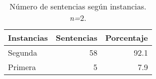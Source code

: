 \begin{table}[H]
\centering
\caption{Número de sentencias según instancias. \textit{n=}2.} 
\label{tab:instancia}
\begin{tabular}{lrr}
  \hline
Instancias & Sentencias & Porcentaje \\ 
  \hline
Segunda & 58 & 92.1 \\ 
  Primera &  5 & 7.9 \\ 
   \hline
\end{tabular}
\end{table}
